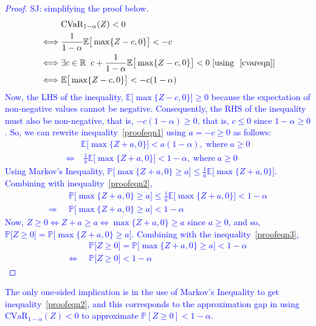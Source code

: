 \documentclass[letterpaper, 10 pt, conference]{ieeeconf}  %
\begin{document}
\textcolor{blue}{\begin{proof} SJ: simplifying the proof below. 
\begin{align}
& \text{CVaR}_{1-\alpha}(Z) < 0 \nonumber \\ 
\iff & \frac{1}{1-\alpha} \mathbb{E}\big[\max\{Z-c,0\}\big] < -c \nonumber \\
\iff & \exists c \in \mathbb{R} \;\; c + \frac{1}{1-\alpha}\mathbb{E}\big[\max\{Z-c,0\}\big] < 0 \; [\text{using }~\eqref{cvareqn}] \nonumber \\
\iff & \mathbb{E}\big[\max\{Z-c,0\}\big] < -c(1-\alpha) \label{proofeqn1}
\end{align} 
Now, the LHS of the inequality,  $\mathbb{E}\big[\max\{Z-c,0\}\big] \geq 0$ because the expectation of non-negative values cannot be negative. Consequently, the RHS of the inequality must also be non-negative, that is, $-c(1-\alpha) \geq 0$, that is, $c \leq 0$ since $1-\alpha \geq 0$. So, we can rewrite  inequality~\eqref{proofeqn1} using $ a = -c \geq 0$ as follows: 
\begin{align}
& \mathbb{E}\big[\max\{Z+a,0\}\big] < a(1-\alpha), \; \text{where} \; a \geq 0 \nonumber \\
\iff & \; \frac{1}{a}\mathbb{E}\big[\max\{Z+a,0\}\big] < 1-\alpha, \; \text{where}  \; a \geq 0 \label{proofeqn2}
\end{align}
Using Markov's Inequality,
$\mathbb{P}\big[\max\{Z+a,0\} \geq a \big] \leq  \frac{1}{a}\mathbb{E}\big[\max\{Z+a,0\}\big]$. Combining with inequality~\eqref{proofeqn2},\\
\begin{align}
& \mathbb{P}\big[\max\{Z+a,0\} \geq a \big] \leq  \frac{1}{a}\mathbb{E}\big[\max\{Z+a,0\}\big] < 1-\alpha \nonumber \\
\Rightarrow \;\; & \mathbb{P}\big[\max\{Z+a,0\} \geq a \big] < 1-\alpha \label{proofeqn3}
\end{align}
Now, $Z \geq 0 \iff Z+a \geq a \iff \max\{Z+a,0\} \geq a $ since $a \geq 0$, and so,\\
$\mathbb{P}\big[Z \geq 0\big] = \mathbb{P}\big[\max\{Z+a,0\} \geq a\big]$.
Combining with the inequality~\eqref{proofeqn3},
\begin{align*}
& \mathbb{P}\big[Z \geq 0\big] = \mathbb{P}\big[\max\{Z+a,0\} \geq a\big] < 1-\alpha \\
\iff \;\; & \mathbb{P}\big[Z \geq 0\big] < 1-\alpha 
\end{align*}
\end{proof}
The only one-sided implication is in the use of Markov's Inequality to get inequality~\eqref{proofeqn2}, and this corresponds to the approximation gap in using 
 $\text{CVaR}_{1-\alpha}(Z) < 0$
 to approximate $\mathbb{P}[Z\geq 0] < 1-\alpha$.\\}
\end{document}
